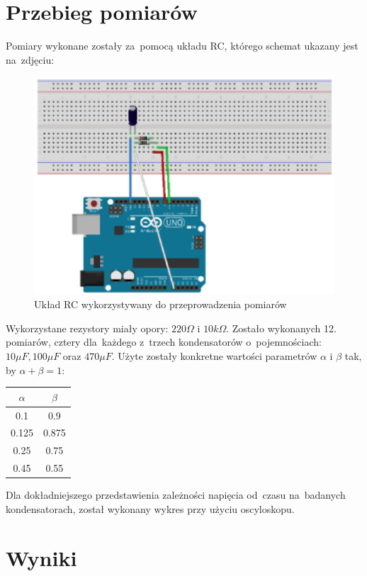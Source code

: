 \documentclass[12pt]{mwart}
\begin{document}
	\section{Przebieg pomiarów}
	\noindent Pomiary wykonane zostały za~pomocą układu RC, którego schemat ukazany jest na~zdjęciu:
	\begin{figure}[H]
		\centering
		\includegraphics[scale = 0.5]{schemat.jpg}
		\caption{Układ RC wykorzystywany do przeprowadzenia pomiarów}
	\end{figure}
	\noindent Wykorzystane rezystory miały opory: $220\Omega$ i $10k\Omega$.
	Zostało wykonanych 12. pomiarów, cztery dla~każdego z~trzech kondensatorów o~pojemnościach: $10\mu F, 100\mu F$ oraz $470\mu F$. Użyte zostały konkretne wartości parametrów $\alpha$ i $\beta$ tak, by $\alpha+\beta=1$:
	\begin{table}[H] %
		\centering
		\begin{tabular}{cc}
			\hline
			$\alpha$ & $\beta$ \\ \hline
			0.1 & 0.9  \\ \hline
			0.125 & 0.875  \\ \hline
			0.25 & 0.75 \\ \hline
			0.45 & 0.55  \\ \hline
		\end{tabular}
	\end{table}
	\noindent Dla dokładniejszego przedstawienia zależności napięcia od~czasu na~badanych kondensatorach, został wykonany wykres przy użyciu oscyloskopu.
	\section{Wyniki}
\end{document}
